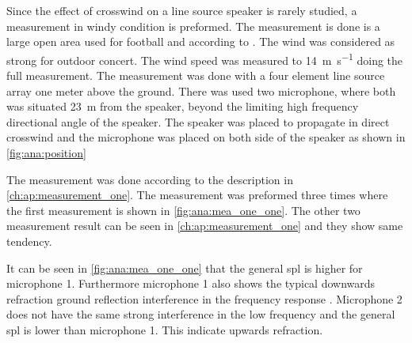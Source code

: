 Since the effect of crosswind on a line source speaker is rarely studied, a measurement in windy condition is preformed. The measurement is done is a large open area used for football and according to \citep{gunness2001loudspeaker}. The wind was considered as strong for outdoor concert. The wind speed was measured to  \SI{14}{\meter\per\second} doing the full measurement. The measurement was done with a four element line source array one meter above the ground. There was used two microphone, where both was situated \SI{23}{\meter} from the speaker, beyond the limiting high frequency directional angle of the speaker. The speaker was placed to propagate in direct crosswind and the microphone was placed on both side of the speaker as shown in \autoref{fig:ana:position}



The measurement was done according to the description in \autoref{ch:ap:measurement_one}. The measurement was preformed three times where the first measurement is shown in \autoref{fig:ana:mea_one_one}. The other two measurement result can be seen in \autoref{ch:ap:measurement_one} and they show same tendency.


It can be seen in \autoref{fig:ana:mea_one_one} that the general \gls{spl} is higher for microphone 1. Furthermore microphone 1 also shows the typical downwards refraction ground reflection interference in the frequency response \citep{tur_on_sound}. Microphone 2 does not have the same strong interference in the low frequency and the general \gls{spl} is lower than microphone 1. This indicate upwards refraction. 



